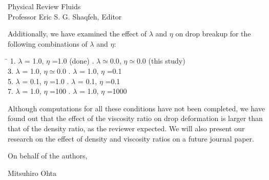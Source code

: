 \documentclass{letter}
\begin{document}
\begin{letter}{
Physical Review Fluids\\
Professor Eric S. G. Shaqfeh, Editor\\}
\begin{enumerate}
Additionally, we have examined the effect of $\lambda$ and $\eta$ on drop
breakup for the following combinations of $\lambda$ and $\eta$:
\\
\begin{tabbing}
 \hspace{55mm} \= \hspace{10mm} \kill
 \hspace{5mm} 1. $\lambda$ = 1.0, $\eta$ =1.0 (done) . $\lambda \simeq 0.0$, $\eta \simeq 0.0$ (this study) \\ 
 \hspace{5mm} 3. $\lambda$ = 1.0, $\eta \simeq 0.0$ . $\lambda$ = 1.0, $\eta$ =0.1 \\
 \hspace{5mm} 5. $\lambda$ = 0.1, $\eta$ =1.0 . $\lambda$ = 0.1, $\eta$ =0.1  \\
 \hspace{5mm} 7. $\lambda$ = 1.0, $\eta$ =100 . $\lambda$ = 1.0, $\eta$ =1000 \\
\end{tabbing}

Although computations for all these conditions have not been completed, we have
found out that the effect of the viscosity ratio on drop deformation is larger
than that of the density ratio, as the reviewer expected.  We will also present
our research on the effect of density and viscosity ratios on a future journal
paper.
\par\noindent

\end{enumerate}

\closing{On behalf of the authors,}
Mitsuhiro Ohta

\end{letter}
\end{document}
